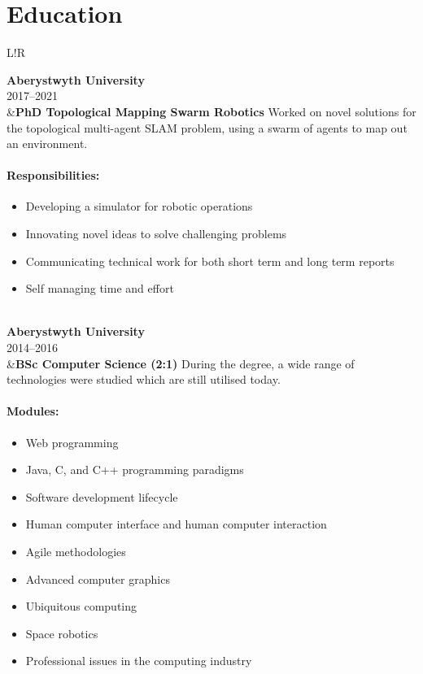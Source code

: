 \documentclass[10pt]{article}
\newcommand\VRule{\color{lightgray}\vrule width 0.5pt}
\begin{document}
\section*{Education}
\begin{longtable}{L!{\VRule}R}

{\bf Aberystwyth University}\\
2017--2021\\
&{\bf PhD Topological Mapping Swarm Robotics}\newline
Worked on novel solutions for the topological multi-agent SLAM problem, using a swarm of agents to map out an environment.

\vspace{-3mm}
\paragraph{Responsibilities:}
\begin{itemize}[noitemsep,topsep=0pt]
	\item Developing a simulator for robotic operations
	\item Innovating novel ideas to solve challenging problems
	\item Communicating technical work for both short term and long term reports
	\item Self managing time and effort
\end{itemize}
\\

{\bf Aberystwyth University}\\
2014--2016\\
&{\bf BSc Computer Science (2:1)}\newline
During the degree, a wide range of technologies were studied which are still utilised today.

\vspace{-3mm}
\paragraph{Modules:}
\begin{itemize}[noitemsep,topsep=0pt]
    \item Web programming
    \item Java, C, and C++ programming paradigms
    \item Software development lifecycle
    \item Human computer interface and human computer interaction
    \item Agile methodologies
    \item Advanced computer graphics
    \item Ubiquitous computing
    \item Space robotics
    \item Professional issues in the computing industry
\end{itemize}
\\


\end{longtable}
\end{document}
